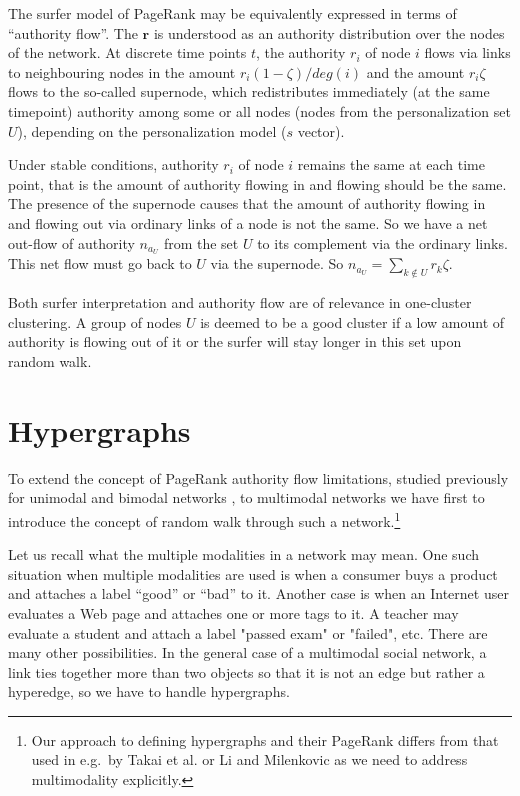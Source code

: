 \documentclass{fundam}
\begin{document}
The surfer model of PageRank may be equivalently expressed in terms of   ``authority flow''.
The $\mathbf{r}$ is understood as an authority distribution over the nodes of the network.
At discrete time points $t$, the authority $r_i$ of node $i$  flows via links to neighbouring nodes in the amount $r_i(1-\zeta)/deg(i)$ and the amount
$r_i\zeta$ flows to the so-called supernode, which redistributes immediately (at the same timepoint) authority among some or all nodes (nodes from the personalization set $U$), depending on the personalization model ($s$ vector).


Under stable conditions, authority $r_i$ of node $i$ remains the same at each time point, that is the amount of authority flowing in and flowing should be the same.
The presence of the supernode causes that the amount of authority flowing in and flowing out via ordinary links of a node is not the same.
So we have a net out-flow of authority $n_{a_U}$ from the set $U$ to its complement
via the ordinary links. This net flow must go back to $U$ via the supernode.
So $n_{a_U}=\sum_{k \not\in U}r_k\zeta$.

Both surfer interpretation and authority flow are of relevance in one-cluster clustering. A group of nodes $U$ is deemed to be a good cluster if a low amount of authority is flowing out of it or the surfer will stay longer in this set upon random walk.


\section{Hypergraphs}\label{sec-hg}

To extend the concept of PageRank
authority flow limitations, studied previously for unimodal \cite{Chen:2015} and bimodal networks \cite{Bipartite:2016},
to multimodal networks we have first to introduce the concept of random walk through such a network.\footnote{Our approach to defining hypergraphs and their PageRank differs from that used in e.g.\  by  Takai et al. \cite{Takai:2020} or Li and Milenkovic \cite{Li:2018:hglapl} as we need to address multimodality explicitly. }

Let us recall what the multiple modalities in a network may mean.
One such situation when multiple modalities are used is when a consumer buys a product and attaches a label ``good'' or ``bad'' to it. Another case is when an Internet   user evaluates a Web page and attaches one or more tags to it.
A teacher may evaluate a student and attach a label "passed exam" or "failed", etc. There are many other possibilities.
%
In the general case of a multimodal social network, a link ties together more than two objects
so that it is not an edge but rather a hyperedge, so we have to handle hypergraphs.
\end{document}
